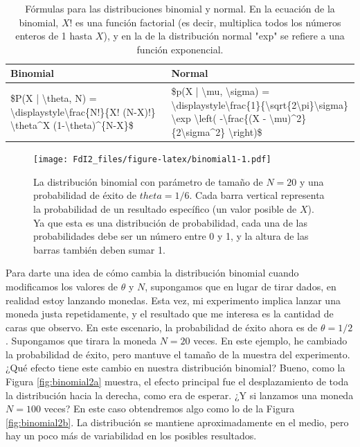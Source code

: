 \documentclass[spanish,]{book}
\begin{document}
\begin{table}[t]

\caption{\label{tab:distformulas}Fórmulas para las distribuciones binomial y normal. En la ecuación de la binomial, $X!$ es una función factorial (es decir, multiplica todos los números enteros de  1 hasta $X$), y en la de la distribución normal "exp" se refiere a una función exponencial.}
\centering
\begin{tabular}{l|l}
\hline
Binomial & Normal\\
\hline
\$P(X | \textbackslash{}theta, N) = \textbackslash{}displaystyle\textbackslash{}frac\{N!\}\{X! (N-X)!\}  \textbackslash{}theta\textasciicircum{}X (1-\textbackslash{}theta)\textasciicircum{}\{N-X\}\$ & \$p(X | \textbackslash{}mu, \textbackslash{}sigma) = \textbackslash{}displaystyle\textbackslash{}frac\{1\}\{\textbackslash{}sqrt\{2\textbackslash{}pi\}\textbackslash{}sigma\} \textbackslash{}exp \textbackslash{}left( -\textbackslash{}frac\{(X - \textbackslash{}mu)\textasciicircum{}2\}\{2\textbackslash{}sigma\textasciicircum{}2\} \textbackslash{}right)\$\\
\hline
\end{tabular}
\end{table}

\begin{figure}
\centering
\texttt{[image: FdI2\_files/figure-latex/binomial1-1.pdf]}
\caption{\label{fig:binomial1} La distribución binomial con parámetro de
tamaño de \(N=20\) y una probabilidad de éxito de \(theta = 1/6\). Cada
barra vertical representa la probabilidad de un resultado específico (un
valor posible de \(X\)). Ya que esta es una distribución de
probabilidad, cada una de las probabilidades debe ser un número entre 0
y 1, y la altura de las barras también deben sumar 1.}
\end{figure}

Para darte una idea de cómo cambia la distribución binomial cuando
modificamos los valores de \(\theta\) y \(N\), supongamos que en lugar
de tirar dados, en realidad estoy lanzando monedas. Esta vez, mi
experimento implica lanzar una moneda justa repetidamente, y el
resultado que me interesa es la cantidad de caras que observo. En este
escenario, la probabilidad de éxito ahora es de \(\theta = 1/2\).
Supongamos que tirara la moneda \(N=20\) veces. En este ejemplo, he
cambiado la probabilidad de éxito, pero mantuve el tamaño de la muestra
del experimento. ¿Qué efecto tiene este cambio en nuestra distribución
binomial? Bueno, como la Figura \ref{fig:binomial2a} muestra, el efecto
principal fue el desplazamiento de toda la distribución hacia la
derecha, como era de esperar. ¿Y si lanzamos una moneda \(N=100\) veces?
En este caso obtendremos algo como lo de la Figura \ref{fig:binomial2b}.
La distribución se mantiene aproximadamente en el medio, pero hay un
poco más de variabilidad en los posibles resultados.
\end{document}
